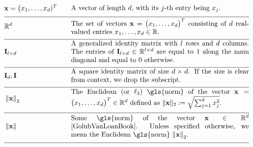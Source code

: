 \begin{align} 
	 &\featurevec=\big(\feature_{1},\ldots,\feature_{\featuredim})^{T} &\quad & \parbox{.75\textwidth}{A vector of length $\featuredim$, with its 
		$\featureidx$-th entry being $\feature_{\featureidx}$.} \nonumber \\[2mm] \hline \nonumber\\[-5mm]
	&\mathbb{R}^{\featuredim} & \quad &  \parbox{.75\textwidth}{The set of vectors $\featurevec=\big(\feature_{1},\ldots,\feature_{\featurelen}\big)^{T}$ consisting of $\featuredim$ real-valued entries $\feature_{1},\ldots,\feature_{\featurelen} \in \mathbb{R}$.} \nonumber \\[2mm] \hline \nonumber\\[-5mm]
	&\mathbf{I}_{\modelidx \times \featuredim}  & \quad &  \parbox{.75\textwidth}{A generalized identity matrix 
		with $\modelidx$ rows and $\featuredim$ columns. The entries of $\mathbf{I}_{\modelidx \times \featuredim} \in \mathbb{R}^{\modelidx \times \featuredim}$ 
		are equal to $1$ along the main diagonal and equal to $0$ otherwise. }\nonumber \\[2mm] \hline \nonumber\\[-5mm] %
	&\mathbf{I}_{\dimlocalmodel}, \mathbf{I} & \quad &  \parbox{.75\textwidth}{A square identity 
		matrix of size $\dimlocalmodel \times \dimlocalmodel$. If the size is clear from 
		context, we drop the subscript.} \nonumber \\[2mm] \hline \nonumber\\[-5mm]
	&\normgeneric{\featurevec}{2}  &\quad & \parbox{.75\textwidth}{The Euclidean (or $\ell_{2}$) \gls{norm} of the vector 
		$\featurevec=\big(\feature_{1},\ldots,\feature_{\featurelen}\big)^{T} \in \mathbb{R}^{\featuredim}$ defined as $ \| \featurevec \|_{2} \defeq \sqrt{\sum_{\featureidx=1}^{\featuredim} \feature_{\featureidx}^{2}}$.} \nonumber \\[2mm] \hline \nonumber\\[-5mm] 
	&\normgeneric{\featurevec}{}  & \quad &  \parbox{.75\textwidth}{Some \gls{norm} of the vector $\featurevec \in \mathbb{R}^{\featuredim}$ \cite{GolubVanLoanBook}. Unless specified otherwise, we mean the Euclidean \gls{norm} $\normgeneric{\featurevec}{2}$.} \nonumber \\[2mm] \hline \nonumber\\[-5mm]

\end{align}
